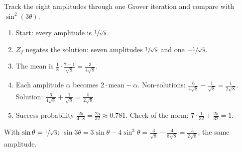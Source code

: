 \begin{exercisebox}
\begin{pproblem}[Inversion about the mean for $N = 8$, $a = 1$]\label{wp:mean8}
    Track the eight amplitudes through one Grover iteration and compare with
    $\sin^2(3\theta)$.
\end{pproblem}
\tcblower
\begin{wsolution}
    \leavevmode
    \begin{enumerate}
        \item Start: every amplitude is $\sfrac{1}{\sqrt{8}}$.
        \item $Z_f$ negates the solution: seven amplitudes $\sfrac{1}{\sqrt{8}}$ and one
              $-\sfrac{1}{\sqrt{8}}$.
        \item The mean is $\frac{1}{8} \cdot \frac{7 - 1}{\sqrt{8}} = \frac{3}{4\sqrt{8}}$.
        \item Each amplitude $\alpha$ becomes $2 \cdot \text{mean} - \alpha$. Non-solutions:
              $\frac{6}{4\sqrt{8}} - \frac{1}{\sqrt{8}} = \frac{1}{2\sqrt{8}}$. Solution:
              $\frac{6}{4\sqrt{8}} + \frac{1}{\sqrt{8}} = \frac{5}{2\sqrt{8}}$.
        \item Success probability $\frac{25}{4 \cdot 8} = \frac{25}{32} \approx 0.781$. Check of the
              norm: $7 \cdot \frac{1}{32} + \frac{25}{32} = 1$.
    \end{enumerate}
    With $\sin\theta = \sfrac{1}{\sqrt{8}}$: $\sin 3\theta = 3\sin\theta - 4\sin^3\theta =
    \frac{3}{\sqrt{8}} - \frac{4}{8\sqrt{8}} = \frac{5}{2\sqrt{8}}$, the same amplitude.
\end{wsolution}
\end{exercisebox}


